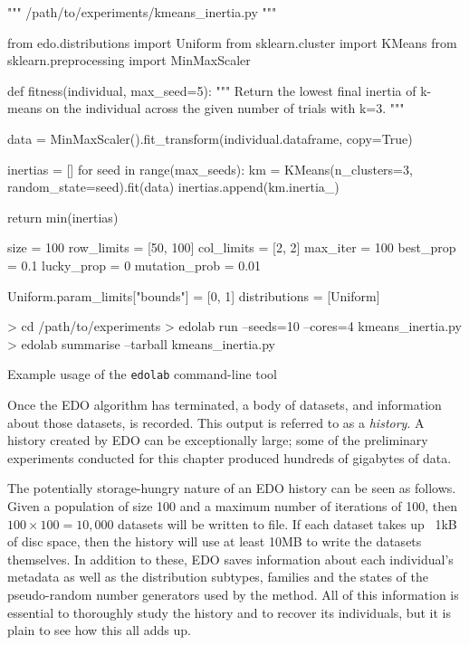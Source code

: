 \begin{listing}
\begin{sourcepy}
""" /path/to/experiments/kmeans_inertia.py """

from edo.distributions import Uniform
from sklearn.cluster import KMeans
from sklearn.preprocessing import MinMaxScaler


def fitness(individual, max_seed=5):
    """ Return the lowest final inertia of k-means on the individual
    across the given number of trials with k=3. """

    data = MinMaxScaler().fit_transform(individual.dataframe, copy=True)

    inertias = []
    for seed in range(max_seeds):
        km = KMeans(n_clusters=3, random_state=seed).fit(data)
        inertias.append(km.inertia_)

    return min(inertias)


size = 100
row_limits = [50, 100]
col_limits = [2, 2]
max_iter = 100
best_prop = 0.1
lucky_prop = 0
mutation_prob = 0.01

Uniform.param_limits["bounds"] = [0, 1]
distributions = [Uniform]
\end{sourcepy}
\caption{%
    An abridged version of the experiment configuration script used in the first
    example
}\label{snp:script}
\end{listing}

\begin{listing}
\begin{usagesh}
> cd /path/to/experiments
> edolab run --seeds=10 --cores=4 kmeans_inertia.py
> edolab summarise --tarball kmeans_inertia.py
\end{usagesh}
\caption{Example usage of the \texttt{edolab} command-line tool}
\label{snp:edolab}
\end{listing}

Once the EDO algorithm has terminated, a body of datasets, and information about
those datasets, is recorded. This output is referred to as a \emph{history}. A
history created by EDO can be exceptionally large; some of the preliminary
experiments conducted for this chapter produced hundreds of gigabytes of data.

The potentially storage-hungry nature of an EDO history can be seen as follows.
Given a population of size 100 and a maximum number of iterations of 100, then
\(100 \times 100 = 10,000\) datasets will be written to file. If each dataset
takes up ~1kB of disc space, then the history will use at least 10MB to write
the datasets themselves. In addition to these, EDO saves information about each
individual's metadata as well as the distribution subtypes, families and the
states of the pseudo-random number generators used by the method. All of this
information is essential to thoroughly study the history and to recover its
individuals, but it is plain to see how this all adds up.

